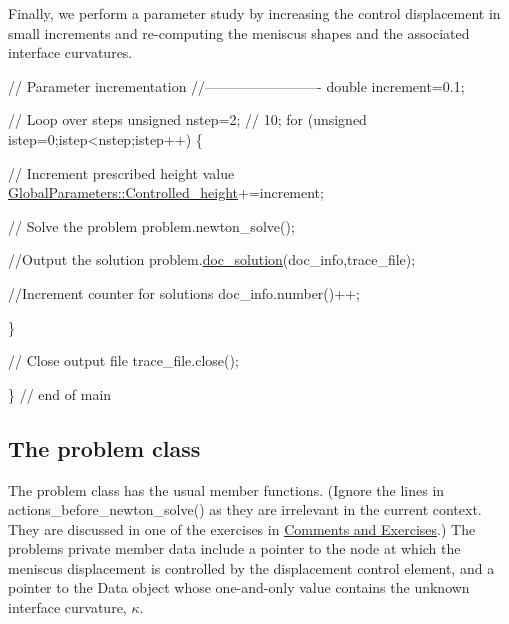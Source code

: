 Finally, we perform a parameter study by increasing the control displacement in small increments and re-\/computing the meniscus shapes and the associated interface curvatures.


\begin{DoxyCodeInclude}

 
 \textcolor{comment}{// Parameter incrementation}
 \textcolor{comment}{//------------------------- }
 \textcolor{keywordtype}{double} increment=0.1;

 \textcolor{comment}{// Loop over steps}
 \textcolor{keywordtype}{unsigned} nstep=2; \textcolor{comment}{// 10;}
 \textcolor{keywordflow}{for} (\textcolor{keywordtype}{unsigned} istep=0;istep<nstep;istep++)
  \{
   
   \textcolor{comment}{// Increment prescribed height value}
   \hyperlink{namespaceGlobalParameters_a3731f24a02ce4f306d65a9a488f85c96}{GlobalParameters::Controlled\_height}+=increment;
   
   \textcolor{comment}{// Solve the problem}
   problem.newton\_solve();
   
   \textcolor{comment}{//Output the solution}
   problem.\hyperlink{classYoungLaplaceProblem_a16f10e66457718eca76d1335dbed8f12}{doc\_solution}(doc\_info,trace\_file);
   
   \textcolor{comment}{//Increment counter for solutions }
   doc\_info.number()++;
   
  \}
 
 \textcolor{comment}{// Close output file}
 trace\_file.close();

\} \textcolor{comment}{// end of main}

\end{DoxyCodeInclude}




 

\hypertarget{index_class}{}\subsection{The problem class}\label{index_class}
The problem class has the usual member functions. (Ignore the lines in {\ttfamily actions\+\_\+before\+\_\+newton\+\_\+solve()} as they are irrelevant in the current context. They are discussed in one of the exercises in \hyperlink{index_comm_ex}{Comments and Exercises}.) The problem\textquotesingle{}s private member data include a pointer to the node at which the meniscus displacement is controlled by the displacement control element, and a pointer to the {\ttfamily Data} object whose one-\/and-\/only value contains the unknown interface curvature, $ \kappa. $

